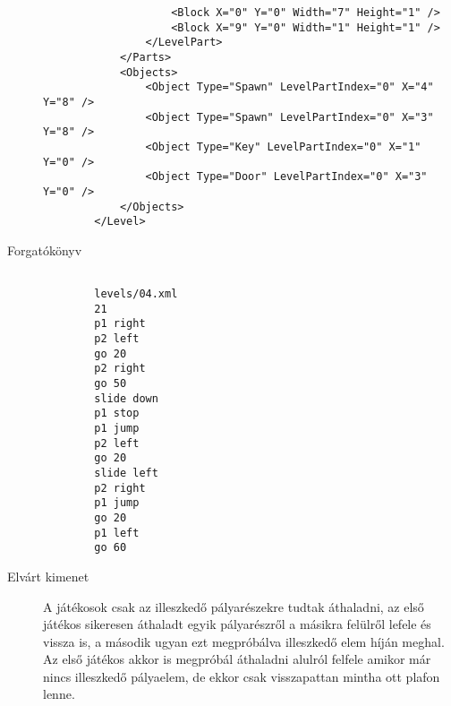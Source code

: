 \begin{description}
\begin{verbatim}
		            <Block X="0" Y="0" Width="7" Height="1" />
		            <Block X="9" Y="0" Width="1" Height="1" />
		        </LevelPart>
		    </Parts>
		    <Objects>
		        <Object Type="Spawn" LevelPartIndex="0" X="4" Y="8" />
		        <Object Type="Spawn" LevelPartIndex="0" X="3" Y="8" />
		        <Object Type="Key" LevelPartIndex="0" X="1" Y="0" />
		        <Object Type="Door" LevelPartIndex="0" X="3" Y="0" />
		    </Objects>
		</Level>
	\end{verbatim}
	
	\item[Forgatókönyv]
	\begin{verbatim}

		levels/04.xml
		21
		p1 right
		p2 left
		go 20
		p2 right
		go 50
		slide down
		p1 stop
		p1 jump
		p2 left
		go 20
		slide left
		p2 right
		p1 jump
		go 20
		p1 left
		go 60
	\end{verbatim}
	
	\item[Elvárt kimenet] A játékosok csak az illeszkedő pályarészekre tudtak áthaladni, az első játékos sikeresen áthaladt egyik pályarészről a másikra felülről lefele és vissza is, a második ugyan ezt megpróbálva illeszkedő elem híján meghal. Az első játékos akkor is megpróbál áthaladni alulról felfele amikor már nincs illeszkedő pályaelem, de ekkor csak visszapattan mintha ott plafon lenne.
	
\end{description}

\newpage

